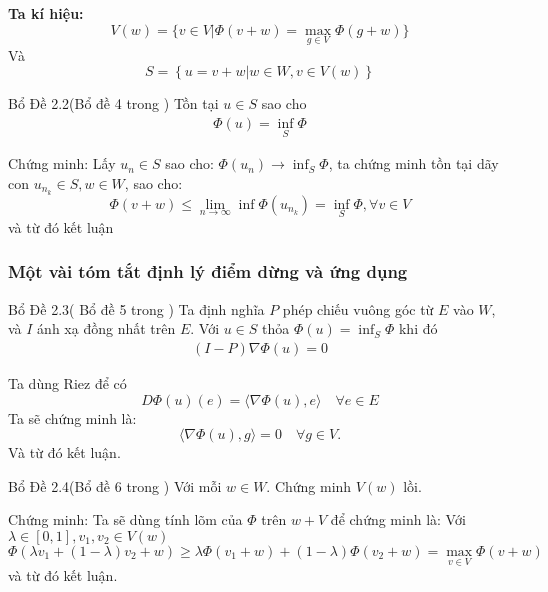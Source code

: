 \documentclass{beamer}
\begin{document}
\begin{frame}
\textbf{Ta kí hiệu: }
$$ V(w)=\{ v \in V| \Phi( v+w ) =\max_{g\in V} \Phi( g+w ) \} $$ 
Và $$S=\left \{ u=v+w|w\in W ,v\in V(w)\right \}$$

\begin{block}{Bổ Đề 2.2(Bổ đề 4 trong \cite{YJMM})}
 Tồn tại  $u \in S$ sao cho 
 \begin{align}
 \Phi \left ( u \right )=\inf_{S}\Phi 
 \label{lem4}
 \end{align}
\end{block}
Chứng minh: Lấy $u_n\in S$ sao cho: $\Phi(u_n)\rightarrow \inf_S\Phi$, ta chứng minh tồn tại dãy con $u_{n_k}\in S,w\in W$, sao cho: $$\Phi \left ( v+w \right )\leq \lim_{n\rightarrow \infty }\inf\Phi \left (u_{n_k}  \right )=\inf_{S}\Phi,\forall v\in V$$
và từ đó kết luận
\end{frame}



\begin{frame}
\frametitle{Một vài tóm tắt định lý điểm dừng và ứng dụng }
\begin{block}{Bổ Đề 2.3( Bổ đề 5 trong \cite{YJMM})}
Ta định nghĩa $P$ phép chiếu vuông góc từ $E$ vào $W$, và $I$ ánh xạ đồng nhất trên $E$. Với $u \in S$ thỏa $\Phi(u) =\inf_S \Phi$ khi đó
\begin{align}
(I-P)\nabla \Phi (u) =0 
\label{Chieu}
\end{align}
\end{block}
Ta dùng Riez để có $$D\Phi(u)(e)= \langle \nabla \Phi(u) , e \rangle  \quad \forall e \in E $$
Ta sẽ chứng minh là:
\[\langle \nabla \Phi(u) , g \rangle =0 \quad \forall g \in V.\]
Và từ đó kết luận.
\end{frame}


\begin{frame}
\begin{block}{Bổ Đề 2.4(Bổ đề 6 trong \cite{YJMM})}
 Với mỗi $w \in W$. Chứng minh $V(w)$ lồi.
\end{block}
Chứng minh: Ta sẽ dùng tính lõm của $\Phi$ trên $w+V$ để chứng minh là: Với $\lambda \in [0,1], v_1,v_2\in V(w)$
\[\Phi(\lambda v_1 +(1-\lambda)v_2+w) \geq \lambda \Phi(v_1+w) + (1-\lambda )\Phi(v_2+w)=\max_{v \in V} \Phi(v+w)\]
và từ đó kết luận.
\end{frame}
\end{document}
